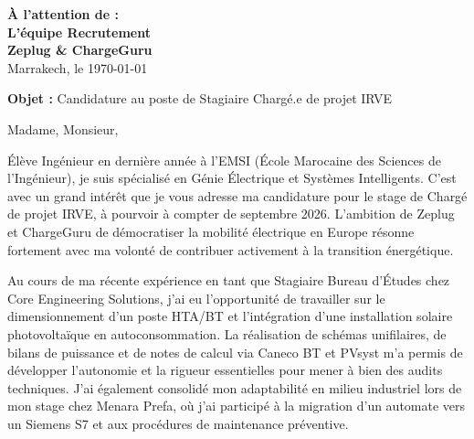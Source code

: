 \documentclass[10pt,a4paper]{../altacv}
\makeatletter
\renewcommand{\makecvheader}{%
  \begingroup
    \raggedright\color{emphasis}%
    {\Huge\bfseries\MakeUppercase{\@name}\par}
    \medskip
    {\large\bfseries\color{accent}\@tagline\par}
    \medskip
    {\footnotesize\bfseries\@personalinfo\par}
  \endgroup\medskip
}
\makeatother
\begin{document}

\makecvheader

\bigskip
\medskip

\begin{flushright}
  {\color{emphasis}\textbf{À l'attention de :}} \\[2pt]
  \textbf{L'équipe Recrutement} \\
  \textbf{Zeplug \& ChargeGuru} \\[20pt]
  Marrakech, le \today
\end{flushright}
\bigskip

\bigskip

{\color{accent}\textbf{Objet :}} Candidature au poste de Stagiaire Chargé.e de projet IRVE

\bigskip\bigskip

Madame, Monsieur,

\vspace{0.4cm}

Élève Ingénieur en dernière année à l'EMSI (École Marocaine des Sciences de l'Ingénieur), je suis spécialisé en Génie Électrique et Systèmes Intelligents. C'est avec un grand intérêt que je vous adresse ma candidature pour le stage de Chargé de projet IRVE, à pourvoir à compter de septembre 2026. L'ambition de Zeplug et ChargeGuru de démocratiser la mobilité électrique en Europe résonne fortement avec ma volonté de contribuer activement à la transition énergétique.

\vspace{0.4cm}

Au cours de ma récente expérience en tant que Stagiaire Bureau d'Études chez Core Engineering Solutions, j'ai eu l'opportunité de travailler sur le dimensionnement d'un poste HTA/BT et l'intégration d'une installation solaire photovoltaïque en autoconsommation. La réalisation de schémas unifilaires, de bilans de puissance et de notes de calcul via Caneco BT et PVsyst m'a permis de développer l'autonomie et la rigueur essentielles pour mener à bien des audits techniques. J'ai également consolidé mon adaptabilité en milieu industriel lors de mon stage chez Menara Prefa, où j'ai participé à la migration d'un automate vers un Siemens S7 et aux procédures de maintenance préventive.
\end{document}
